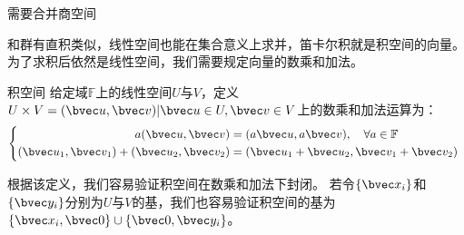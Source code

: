 

\begin{issues}
\issueDraft 
需要合并商空间
\end{issues}
和群有直积类似，线性空间也能在集合意义上求并，笛卡尔积就是积空间的向量。为了求积后依然是线性空间，我们需要规定向量的数乘和加法。

\begin{definition}{积空间}
给定域$\mathbb F $上的线性空间$U$与$V$，定义$U\times V={(\bvec u,\bvec v)|\bvec u\in U,\bvec v\in V}$上的数乘和加法运算为：
\begin{equation}
\left\{\begin{aligned}
a(\bvec u,\bvec v)&=(a\bvec u,a\bvec v),\quad \forall a\in \mathbb F\\
(\bvec u_1,\bvec v_1)+(\bvec u_2,\bvec v_2)&=(\bvec u_1+\bvec u_2,\bvec v_1+\bvec v_2)
\end{aligned}\right.~
\end{equation}
\end{definition}
根据该定义，我们容易验证积空间在数乘和加法下封闭。
若令$\{\bvec x_i\}$和$\{\bvec y_i\}$分别为$U$与$V$的基，我们也容易验证积空间的基为$\{\bvec x_i,\bvec 0\}\cup \{\bvec 0,\bvec y_i\}$。
